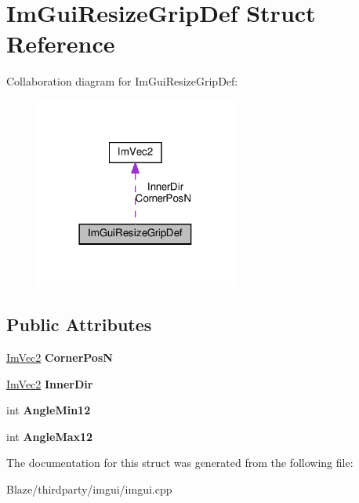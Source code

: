 \hypertarget{structImGuiResizeGripDef}{}\section{Im\+Gui\+Resize\+Grip\+Def Struct Reference}
\label{structImGuiResizeGripDef}


Collaboration diagram for Im\+Gui\+Resize\+Grip\+Def\+:\nopagebreak
\begin{figure}[H]
\begin{center}
\leavevmode
\includegraphics[width=189pt]{structImGuiResizeGripDef__coll__graph}
\end{center}
\end{figure}
\subsection*{Public Attributes}
\begin{DoxyCompactItemize}
\item 
\mbox{\label{structImGuiResizeGripDef_ae2f7763b170625f6413e582c971f1792}} 
\hyperlink{structImVec2}{Im\+Vec2} {\bfseries Corner\+PosN}
\item 
\mbox{\label{structImGuiResizeGripDef_a82a1367d835f206fc24b3f114c60f897}} 
\hyperlink{structImVec2}{Im\+Vec2} {\bfseries Inner\+Dir}
\item 
\mbox{\label{structImGuiResizeGripDef_a5b335b7be8f517e38c56a5fd8e01d54c}} 
int {\bfseries Angle\+Min12}
\item 
\mbox{\label{structImGuiResizeGripDef_a697cdecca28177e275ce7ec38ef8e802}} 
int {\bfseries Angle\+Max12}
\end{DoxyCompactItemize}


The documentation for this struct was generated from the following file\+:\begin{DoxyCompactItemize}
\item 
Blaze/thirdparty/imgui/imgui.\+cpp\end{DoxyCompactItemize}
